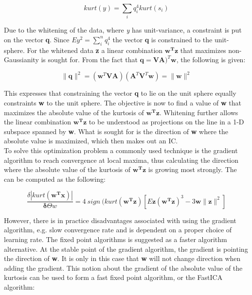 \begin{equation}
kurt(y) = \sum_{i} q_{i}^{4}kurt(s_i)
\end{equation}
 			
Due to the whitening of the data, where \textit{y} has unit-variance, a constraint is put on the vector \textbf{q}. Since $E{y^2} = \sum_{i}^{n} q_{i}^{4}$ the vector \textbf{q} is constrained to the unit-sphere. For the whitened data \textbf{z} a linear combination $\mathbf{w^T}\mathbf{z}$ that maximizes non-Gaussianity is sought for. From the fact that $\mathbf{q} = \mathbf{V}\mathbf{A})^{T}\mathbf{w}$, the following is given:
 			
\begin{equation}
\parallel \mathbf{q} \parallel^{2}= (\mathbf{w}^{T}\mathbf{V}\mathbf{A})(\mathbf{A}^{T}\mathbf{V}^{T}\mathbf{w}) = \parallel \mathbf{w} \parallel^{2}
\end{equation}
 			
This expresses that constraining the vector \textbf{q} to lie on the unit sphere equally constraints \textbf{w} to the unit sphere. The objective is now to find a value of \textbf{w} that maximizes the absolute value of the kurtosis of $\mathbf{w^T}\mathbf{z}$. Whitening further allows the linear combination $\mathbf{w^T}\mathbf{z}$ to be understood as projections on the line in a 1-D subspace spanned by \textbf{w}. What is sought for is the direction of \textbf{w} where the absolute value is maximized, which then makes out an IC. \\
To solve this optimization problem a commonly used technique is the gradient algorithm to reach convergence at local maxima, thus calculating the direction where the absolute value of the kurtosis of $\mathbf{w^T}\mathbf{z}$ is growing most strongly. The can be computed as the following:
 			
\begin{equation}
\frac{\delta|kurt(\mathbf{w^T}\mathbf{x})|}{\mathbf\delta\varTheta{w}} = 4 ~ sign ~ (kurt(\mathbf{w^T}\mathbf{z})[E{\mathbf{z}(\mathbf{w^T}\mathbf{z})^{3}} - 3\mathbf{w}\parallel\mathbf{z}\parallel ^{2}]
\end{equation}
 				
However, there is in practice disadvantages associated with using the gradient algorithm, e.g. slow convergence rate and is dependent on a proper choice of learning rate. The fixed point algorithms is suggested as a faster algorithm alternative. At the stable point of the gradient algorithm, the gradient is pointing the direction of \textbf{w}. It is only in this case that \textbf{w} will not change direction when adding the gradient. This notion about the gradient of the absolute value of the kurtosis can be used to form a fast fixed point algorithm, or the FastICA algorithm:
 				
